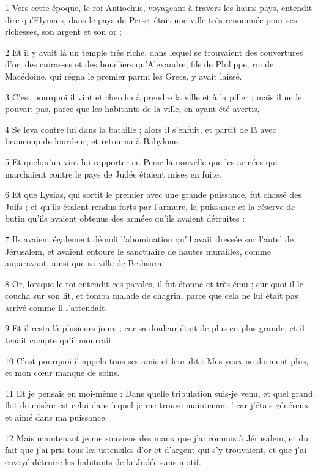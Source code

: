 \par 1 Vers cette époque, le roi Antiochus, voyageant à travers les hauts pays, entendit dire qu'Elymais, dans le pays de Perse, était une ville très renommée pour ses richesses, son argent et son or ;
\par 2 Et il y avait là un temple très riche, dans lequel se trouvaient des couvertures d'or, des cuirasses et des boucliers qu'Alexandre, fils de Philippe, roi de Macédoine, qui régna le premier parmi les Grecs, y avait laissé.
\par 3 C'est pourquoi il vint et chercha à prendre la ville et à la piller ; mais il ne le pouvait pas, parce que les habitants de la ville, en ayant été avertis,
\par 4 Se leva contre lui dans la bataille ; alors il s'enfuit, et partit de là avec beaucoup de lourdeur, et retourna à Babylone.
\par 5 Et quelqu'un vint lui rapporter en Perse la nouvelle que les armées qui marchaient contre le pays de Judée étaient mises en fuite.
\par 6 Et que Lysias, qui sortit le premier avec une grande puissance, fut chassé des Juifs ; et qu'ils étaient rendus forts par l'armure, la puissance et la réserve de butin qu'ils avaient obtenus des armées qu'ils avaient détruites :
\par 7 Ils avaient également démoli l'abomination qu'il avait dressée sur l'autel de Jérusalem, et avaient entouré le sanctuaire de hautes murailles, comme auparavant, ainsi que sa ville de Bethsura.
\par 8 Or, lorsque le roi entendit ces paroles, il fut étonné et très ému ; sur quoi il le coucha sur son lit, et tomba malade de chagrin, parce que cela ne lui était pas arrivé comme il l'attendait.
\par 9 Et il resta là plusieurs jours ; car sa douleur était de plus en plus grande, et il tenait compte qu'il mourrait.
\par 10 C'est pourquoi il appela tous ses amis et leur dit : Mes yeux ne dorment plus, et mon cœur manque de soins.
\par 11 Et je pensais en moi-même : Dans quelle tribulation suis-je venu, et quel grand flot de misère est celui dans lequel je me trouve maintenant ! car j'étais généreux et aimé dans ma puissance.
\par 12 Mais maintenant je me souviens des maux que j'ai commis à Jérusalem, et du fait que j'ai pris tous les ustensiles d'or et d'argent qui s'y trouvaient, et que j'ai envoyé détruire les habitants de la Judée sans motif.
